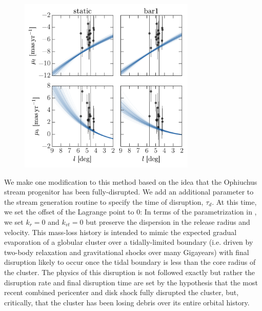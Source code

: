 \documentclass[letterpaper,12pt,preprint]{aastex}
\begin{document}
\begin{figure}[!tbp]
\begin{center}
\includegraphics[width=0.75\textwidth]{figures/orbitfits-pm}
\caption{ }
\label{fig:orbitfits-pm}
\end{center}
\end{figure}

We make one modification to this method based on the idea that the Ophiuchus stream progenitor has been fully-disrupted. We add an additional parameter to the stream generation routine to specify the time of disruption, $\tau_d$. At this time, we set the offset of the Lagrange point to 0: In terms of the parametrization in \citep{fardal14}, we set $k_r = 0$ and $k_{vt}=0$ but preserve the dispersion in the release radius and velocity.  This mass-loss history is intended to mimic the expected gradual evaporation of a globular cluster over a tidally-limited boundary (i.e. driven by two-body relaxation and gravitational shocks over many Gigayears) with final disruption likely to occur once the tidal boundary is less than the core radius of the cluster. The physics of this disruption is not followed exactly but rather the disruption rate and final disruption time are set by the hypothesis that the most recent combined pericenter and disk shock fully disrupted the cluster, but, critically, that the cluster has been losing debris over its entire orbital history.
\end{document}
